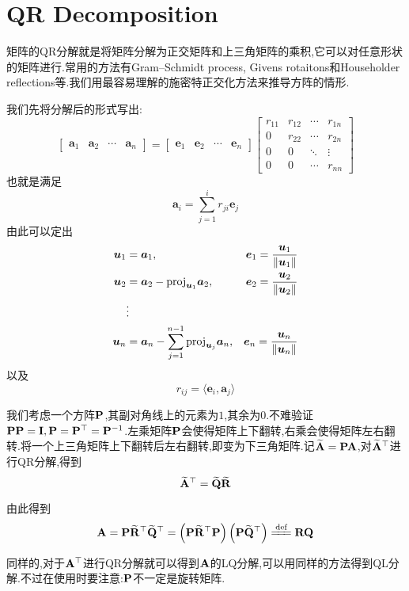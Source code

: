 \section{QR Decomposition}
\label{QR Decomposition}
矩阵的QR分解就是将矩阵分解为正交矩阵和上三角矩阵的乘积,它可以对任意形状的矩阵进行.常用的方法有Gram–Schmidt process, Givens rotaitons和Householder reflections等.我们用最容易理解的施密特正交化方法来推导方阵的情形.

我们先将分解后的形式写出:
\begin{equation}
	\begin{bmatrix}
		\bm a_1 & \bm a_2 & \cdots & \bm a_n
	\end{bmatrix}
	=
	\begin{bmatrix}
		\bm e_1 & \bm e_2 & \cdots & \bm e_n
	\end{bmatrix}
	\begin{bmatrix}
		r_{11} & r_{12}  & \cdots & r_{1n}
		\\
		0 & r_{22} & \cdots  & r_{2n}
		\\
		0 & 0 & \ddots & \vdots
		\\
		0 & 0 & \cdots & r_{nn}
	\end{bmatrix}
\end{equation}
也就是满足
\begin{equation}
	\bm a_i = \sum_{j = 1}^{i} r_{ji} \bm e_j
\end{equation}
由此可以定出
\begin{equation}
	\begin{aligned}
		\boldsymbol u_1 &= \boldsymbol a_1, \quad &\boldsymbol e_1 = \frac{\boldsymbol u_1}{\left \Vert \boldsymbol u_1 \right \Vert}
		\\
		\boldsymbol u_2 &= \boldsymbol a_2 - \text{proj}_{\boldsymbol u_1} \boldsymbol a_2, & \boldsymbol e_2 = \frac{\boldsymbol u_2}{\left \Vert \boldsymbol u_2 \right \Vert}
		\\
		&\vdots 
		\\
		\boldsymbol u_n &= \boldsymbol a_n - \sum_{j=1}^{n-1} \text{proj}_{\boldsymbol u_j} \boldsymbol a_n , &\boldsymbol e_n = \frac{\boldsymbol u_n}{\left \Vert \boldsymbol u_n \right \Vert}
	\end{aligned} 
\end{equation}
以及
\begin{equation}
	r_{ij} = \langle \bm e_i, \bm a_j \rangle
\end{equation}

我们考虑一个方阵$\bold{P}$,其副对角线上的元素为$1$,其余为$0$.不难验证$\bold{P}\bold{P} = \bold{I}, \bold{P} = \bold{P}^\top = \bold{P}^{-1}$.左乘矩阵$\bold{P}$会使得矩阵上下翻转,右乘会使得矩阵左右翻转.将一个上三角矩阵上下翻转后左右翻转,即变为下三角矩阵.记$\widetilde{\bold{A}} = \bold{P} \bold{A}$,对$\widetilde{\bold{A}}^\top$进行QR分解,得到
\begin{equation}
	\widetilde{\bold{A}}^\top = \widetilde{\bold{Q}} \widetilde{\bold{R}}
\end{equation}

由此得到
\begin{equation}
	\bd A = \bd P \widetilde{\bd R}^\top \widetilde{\bd Q}^\top = \xk{\bd P \widetilde{\bd R}^\top \bd P} \xk{\bd P \widetilde{\bd Q}^\top} \xlongequal{\text{def}} \bd R \bd Q
\end{equation}

同样的,对于$\bold{A}^{\top}$进行QR分解就可以得到$\bold{A}$的LQ分解,可以用同样的方法得到QL分解.不过在使用时要注意:$\bold{P}$不一定是旋转矩阵.